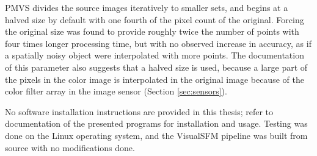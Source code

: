 PMVS divides the source images iteratively to smaller sets, and begins at a halved size by default with one fourth of the pixel count of the original.
Forcing the original size was found to provide roughly twice the number of points with four times longer processing time, but with no observed increase in accuracy, as if a spatially noisy object were interpolated with more points.
The documentation of this parameter also suggests that a halved size is used, because a large part of the pixels in the color image is interpolated in the original image because of the color filter array in the image sensor (Section \ref{sec:sensors}).

No software installation instructions are provided in this thesis; refer to documentation of the presented programs for installation and usage.
Testing was done on the Linux operating system, and the VisualSFM pipeline was built from source with no modifications done.

